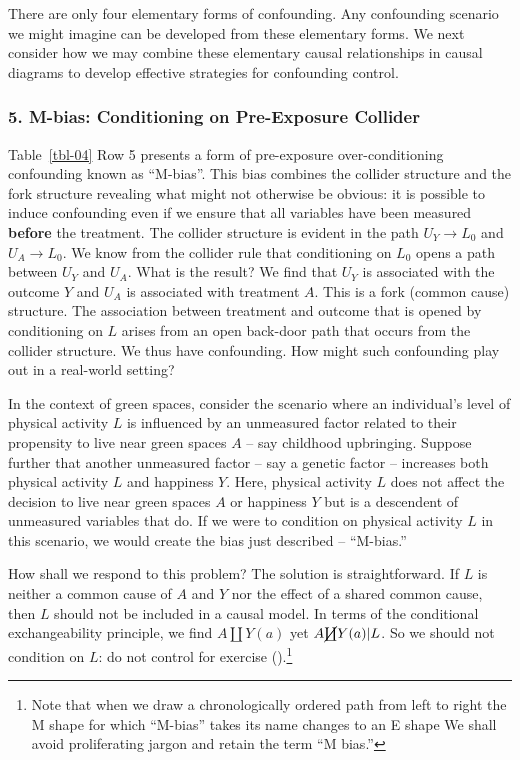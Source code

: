 \documentclass[
  singlecolumn]{article}
\begin{document}
There are only four elementary forms of confounding. Any confounding
scenario we might imagine can be developed from these elementary forms.
We next consider how we may combine these elementary causal
relationships in causal diagrams to develop effective strategies for
confounding control.

\subsubsection{5. M-bias: Conditioning on Pre-Exposure
Collider}\label{m-bias-conditioning-on-pre-exposure-collider}

Table~\ref{tbl-04} Row 5 presents a form of pre-exposure
over-conditioning confounding known as ``M-bias''. This bias combines
the collider structure and the fork structure revealing what might not
otherwise be obvious: it is possible to induce confounding even if we
ensure that all variables have been measured \textbf{before} the
treatment. The collider structure is evident in the path \(U_Y \to L_0\)
and \(U_A \to L_0\). We know from the collider rule that conditioning on
\(L_0\) opens a path between \(U_Y\) and \(U_A\). What is the result? We
find that \(U_Y\) is associated with the outcome \(Y\) and \(U_A\) is
associated with treatment \(A\). This is a fork (common cause)
structure. The association between treatment and outcome that is opened
by conditioning on \(L\) arises from an open back-door path that occurs
from the collider structure. We thus have confounding. How might such
confounding play out in a real-world setting?

In the context of green spaces, consider the scenario where an
individual's level of physical activity \(L\) is influenced by an
unmeasured factor related to their propensity to live near green spaces
\(A\) -- say childhood upbringing. Suppose further that another
unmeasured factor -- say a genetic factor -- increases both physical
activity \(L\) and happiness \(Y\). Here, physical activity \(L\) does
not affect the decision to live near green spaces \(A\) or happiness
\(Y\) but is a descendent of unmeasured variables that do. If we were to
condition on physical activity \(L\) in this scenario, we would create
the bias just described -- ``M-bias.''

How shall we respond to this problem? The solution is straightforward.
If \(L\) is neither a common cause of \(A\) and \(Y\) nor the effect of
a shared common cause, then \(L\) should not be included in a causal
model. In terms of the conditional exchangeability principle, we find
\(A \coprod Y(a)\) yet \(A \cancel{\coprod} Y(a)| L\). So we should not
condition on \(L\): do not control for exercise
().\footnote{Note that
  when we draw a chronologically ordered path from left to right the M
  shape for which ``M-bias'' takes its name changes to an E shape We
  shall avoid proliferating jargon and retain the term ``M bias.''}
\end{document}
